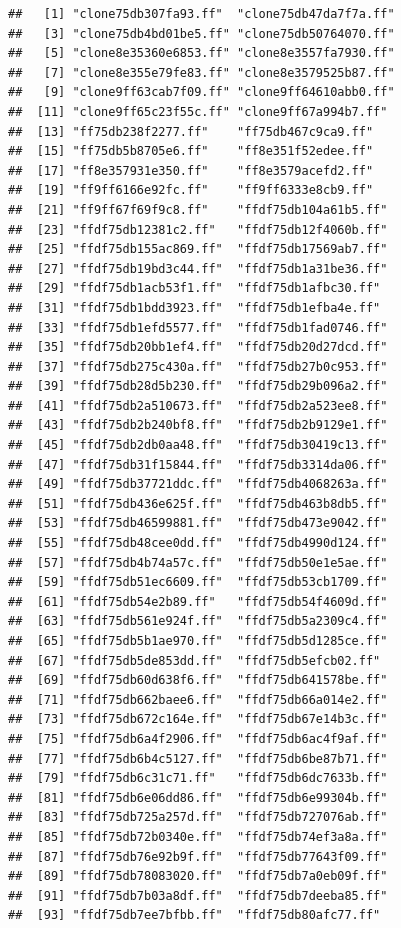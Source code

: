\documentclass[
  12pt,
]{style/krantz}
\begin{document}
\begin{verbatim}
##   [1] "clone75db307fa93.ff"  "clone75db47da7f7a.ff"
##   [3] "clone75db4bd01be5.ff" "clone75db50764070.ff"
##   [5] "clone8e35360e6853.ff" "clone8e3557fa7930.ff"
##   [7] "clone8e355e79fe83.ff" "clone8e3579525b87.ff"
##   [9] "clone9ff63cab7f09.ff" "clone9ff64610abb0.ff"
##  [11] "clone9ff65c23f55c.ff" "clone9ff67a994b7.ff" 
##  [13] "ff75db238f2277.ff"    "ff75db467c9ca9.ff"   
##  [15] "ff75db5b8705e6.ff"    "ff8e351f52edee.ff"   
##  [17] "ff8e357931e350.ff"    "ff8e3579acefd2.ff"   
##  [19] "ff9ff6166e92fc.ff"    "ff9ff6333e8cb9.ff"   
##  [21] "ff9ff67f69f9c8.ff"    "ffdf75db104a61b5.ff" 
##  [23] "ffdf75db12381c2.ff"   "ffdf75db12f4060b.ff" 
##  [25] "ffdf75db155ac869.ff"  "ffdf75db17569ab7.ff" 
##  [27] "ffdf75db19bd3c44.ff"  "ffdf75db1a31be36.ff" 
##  [29] "ffdf75db1acb53f1.ff"  "ffdf75db1afbc30.ff"  
##  [31] "ffdf75db1bdd3923.ff"  "ffdf75db1efba4e.ff"  
##  [33] "ffdf75db1efd5577.ff"  "ffdf75db1fad0746.ff" 
##  [35] "ffdf75db20bb1ef4.ff"  "ffdf75db20d27dcd.ff" 
##  [37] "ffdf75db275c430a.ff"  "ffdf75db27b0c953.ff" 
##  [39] "ffdf75db28d5b230.ff"  "ffdf75db29b096a2.ff" 
##  [41] "ffdf75db2a510673.ff"  "ffdf75db2a523ee8.ff" 
##  [43] "ffdf75db2b240bf8.ff"  "ffdf75db2b9129e1.ff" 
##  [45] "ffdf75db2db0aa48.ff"  "ffdf75db30419c13.ff" 
##  [47] "ffdf75db31f15844.ff"  "ffdf75db3314da06.ff" 
##  [49] "ffdf75db37721ddc.ff"  "ffdf75db4068263a.ff" 
##  [51] "ffdf75db436e625f.ff"  "ffdf75db463b8db5.ff" 
##  [53] "ffdf75db46599881.ff"  "ffdf75db473e9042.ff" 
##  [55] "ffdf75db48cee0dd.ff"  "ffdf75db4990d124.ff" 
##  [57] "ffdf75db4b74a57c.ff"  "ffdf75db50e1e5ae.ff" 
##  [59] "ffdf75db51ec6609.ff"  "ffdf75db53cb1709.ff" 
##  [61] "ffdf75db54e2b89.ff"   "ffdf75db54f4609d.ff" 
##  [63] "ffdf75db561e924f.ff"  "ffdf75db5a2309c4.ff" 
##  [65] "ffdf75db5b1ae970.ff"  "ffdf75db5d1285ce.ff" 
##  [67] "ffdf75db5de853dd.ff"  "ffdf75db5efcb02.ff"  
##  [69] "ffdf75db60d638f6.ff"  "ffdf75db641578be.ff" 
##  [71] "ffdf75db662baee6.ff"  "ffdf75db66a014e2.ff" 
##  [73] "ffdf75db672c164e.ff"  "ffdf75db67e14b3c.ff" 
##  [75] "ffdf75db6a4f2906.ff"  "ffdf75db6ac4f9af.ff" 
##  [77] "ffdf75db6b4c5127.ff"  "ffdf75db6be87b71.ff" 
##  [79] "ffdf75db6c31c71.ff"   "ffdf75db6dc7633b.ff" 
##  [81] "ffdf75db6e06dd86.ff"  "ffdf75db6e99304b.ff" 
##  [83] "ffdf75db725a257d.ff"  "ffdf75db727076ab.ff" 
##  [85] "ffdf75db72b0340e.ff"  "ffdf75db74ef3a8a.ff" 
##  [87] "ffdf75db76e92b9f.ff"  "ffdf75db77643f09.ff" 
##  [89] "ffdf75db78083020.ff"  "ffdf75db7a0eb09f.ff" 
##  [91] "ffdf75db7b03a8df.ff"  "ffdf75db7deeba85.ff" 
##  [93] "ffdf75db7ee7bfbb.ff"  "ffdf75db80afc77.ff"  

\end{verbatim}
\end{document}
